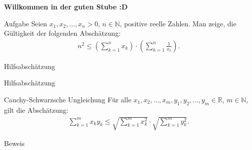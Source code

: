 \documentclass[10pt]{beamer}
\title{}
\author{Artur's Mathematikstübchen}
\date{}
\def\bN{\mathbb{N}}
\def\bR{\mathbb{R}}
\begin{document}

\begin{frame}
    \begin{center}
        \textbf{\huge Willkommen in der guten Stube \newline \newline :D}
    \end{center}
\end{frame}




\begin{frame}
    \begin{alertblock}{Aufgabe}
        Seien \( x_{1}, x_{2}, \ldots, x_{n} > 0 \), \( n \in \bN \), positive reelle Zahlen. Man zeige, die Gültigkeit der folgenden Abschätzung:
        \begin{align*}
            n^{2}
            \leq \left( \sum_{k = 1}^{n} x_{k} \right) \cdot \left( \sum_{k = 1}^{n} \frac{1}{x_{k}} \right).
        \end{align*}
    \end{alertblock}
\end{frame}



\begin{frame}{Hilfsabschätzung}
    
\end{frame}



\begin{frame}{Hilfsabschätzung}
    \begin{block}{Cauchy-Schwarzsche Ungleichung}
        Für alle \( x_{1}, x_{2}, \ldots, x_{m}, y_{1}, y_{2}, \ldots, y_{m} \in \bR \), \( m \in \bN \), gilt die Abschätzung:
        \begin{align*}
            \sum_{k = 1}^{m} x_{k} y_{k}
            \leq \sqrt{\sum_{k = 1}^{m} x_{k}^{2}} \cdot \sqrt{\sum_{k = 1}^{m} y_{k}^{2}}.
        \end{align*}
    \end{block}
\end{frame}



\begin{frame}{Beweis}
    
\end{frame}
\end{document}
